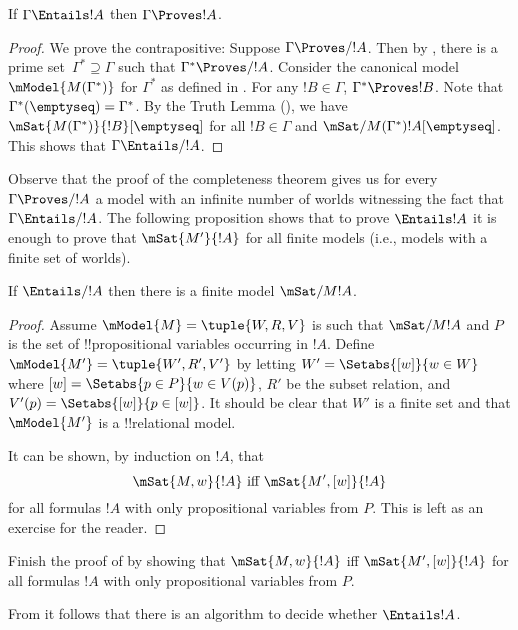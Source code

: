 \documentclass[../../../include/open-logic-section]{subfiles}
\begin{document}


\begin{thm}
  If $\Gamma \Entails !A$ then $\Gamma \Proves !A$.
\end{thm}

\begin{proof}
  We prove the contrapositive: Suppose $\Gamma \Proves/ !A$. Then by
  , there is a prime set~$\Gamma^*
  \supseteq \Gamma$ such that $\Gamma^* \Proves/ !A$. Consider the
  canonical model~$\mModel{M(\Gamma^*)}$ for $\Gamma^*$ as defined in
  . For any $!B \in \Gamma$, $\Gamma^*
  \Proves !B$. Note that $\Gamma^*(\emptyseq) = \Gamma^*$. By the Truth
  Lemma (), we have
  $\mSat{M(\Gamma^*)}{!B}[\emptyseq]$ for all $!B \in \Gamma$ and
  $\mSat/{M(\Gamma^*)}{!A}[\emptyseq]$. This shows that $\Gamma
  \Entails/ !A$.
\end{proof}

Observe that the proof of the completeness theorem gives us for 
every $\Gamma \Proves/ !A$ a model with an infinite number of worlds 
witnessing the fact that $\Gamma \Entails/ !A$. The following proposition shows 
that to prove $\Entails !A$ it is enough to prove that $\mSat{M'}{!A}$ 
for all finite models (i.e., models with a finite set of worlds).

\begin{thm}
  If $\Entails/ !A$ then there is a finite model $\mSat/{M}{!A}$.
\end{thm}
\begin{proof}
  Assume $\mModel{M}=\tuple{W, R, V}$ is such that $\mSat/{M}{!A}$ and $P$ 
  is the set of !!{propositional variable}s occurring in $!A$. Define
  $\mModel{M'}=\tuple{W', R', V'}$ by letting $W' = \Setabs{[w]}{w \in W}$ 
  where $[w] = \Setabs{p \in P}{w \in V(p)}$, $R'$ be the subset relation, 
  and $V'(p)=\Setabs{[w]}{p \in [w]}$. It should be clear that $W'$ is a 
  finite set and that $\mModel{M'}$ is a !!{relational model}.

  It can be shown, by induction on $!A$, that 
  $$ \mSat{M,w}{!A} \text{ iff } \mSat{M',[w]}{!A}$$
  for all formulas $!A$ with only propositional variables from $P$. This is left as an exercise for the reader.
\end{proof}

\begin{prob}
Finish the proof of  by showing that $\mSat{M,w}{!A}$ iff 
$\mSat{M',[w]}{!A}$ for all formulas $!A$ with only propositional variables from $P$. 
\end{prob}

From  it follows that there is an algorithm to decide whether $\Entails !A$.
\end{document}
